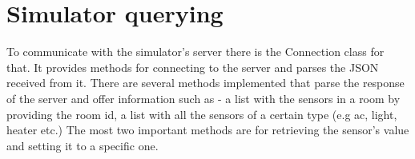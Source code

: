 \section{Simulator querying}
To communicate with the simulator's server there is the Connection class for that. It provides methods for connecting to the server and parses the JSON received from it. There are several methods implemented that parse the response of the server and offer information such as - a list with the sensors in a room by providing the room id, a list with all the sensors of a certain type (e.g ac, light, heater etc.) The most two important methods are for retrieving the sensor's value and setting it to a specific one. 
